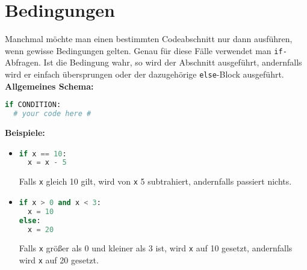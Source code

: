 \documentclass{article}
\begin{document}
	\section{Bedingungen}
	Manchmal möchte man einen bestimmten Codeabschnitt nur dann ausführen, wenn gewisse Bedingungen gelten. Genau für diese Fälle verwendet man \texttt{if-}Abfragen. Ist die Bedingung wahr, so wird der Abschnitt ausgeführt, andernfalls wird er einfach übersprungen oder der dazugehörige \texttt{else}-Block ausgeführt.\\
	\textbf{Allgemeines Schema:}
	\begin{lstlisting}[language=Python]
if CONDITION:
  # your code here #
	\end{lstlisting}
	\textbf{Beispiele:}
	\begin{itemize}
		\item \begin{lstlisting}[language=Python]
if x == 10:
  x = x - 5
		\end{lstlisting}
		Falls \texttt{x} gleich 10 gilt, wird von \texttt{x} 5 subtrahiert, andernfalls passiert nichts.
		
		\item \begin{lstlisting}[language=Python]
if x > 0 and x < 3:
  x = 10
else:
  x = 20
		\end{lstlisting}
		Falls \texttt{x} größer als 0 und kleiner als 3 ist, wird \texttt{x} auf 10 gesetzt, andernfalls wird \texttt{x} auf 20 gesetzt.
	\end{itemize}
	
\end{document}
